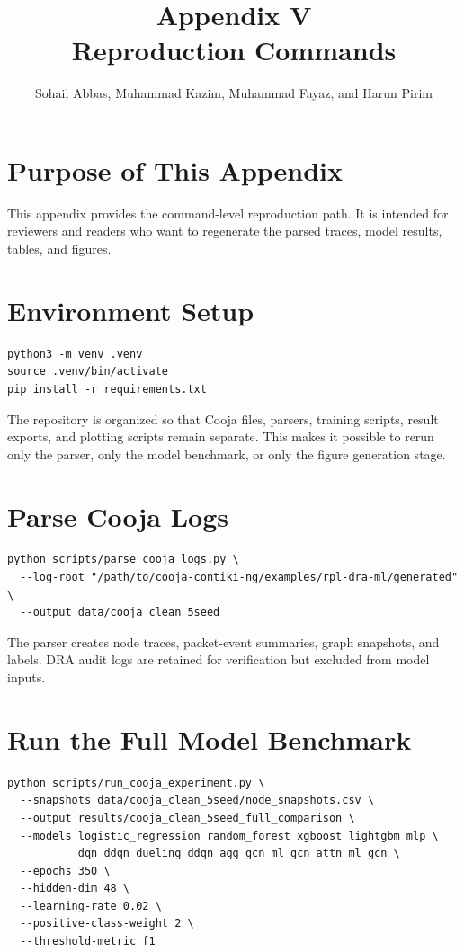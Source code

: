 \documentclass[10pt]{article}
\title{\vspace{-1.2cm}Appendix V\\Reproduction Commands}
\author{Sohail Abbas, Muhammad Kazim, Muhammad Fayaz, and Harun Pirim}
\date{}
\begin{document}
\maketitle

\section{Purpose of This Appendix}
This appendix provides the command-level reproduction path. It is intended for reviewers and readers who want to regenerate the parsed traces, model results, tables, and figures.

\section{Environment Setup}
\begin{lstlisting}
python3 -m venv .venv
source .venv/bin/activate
pip install -r requirements.txt
\end{lstlisting}

The repository is organized so that Cooja files, parsers, training scripts, result exports, and plotting scripts remain separate. This makes it possible to rerun only the parser, only the model benchmark, or only the figure generation stage.

\section{Parse Cooja Logs}
\begin{lstlisting}
python scripts/parse_cooja_logs.py \
  --log-root "/path/to/cooja-contiki-ng/examples/rpl-dra-ml/generated" \
  --output data/cooja_clean_5seed
\end{lstlisting}

The parser creates node traces, packet-event summaries, graph snapshots, and labels. DRA audit logs are retained for verification but excluded from model inputs.

\section{Run the Full Model Benchmark}
\begin{lstlisting}
python scripts/run_cooja_experiment.py \
  --snapshots data/cooja_clean_5seed/node_snapshots.csv \
  --output results/cooja_clean_5seed_full_comparison \
  --models logistic_regression random_forest xgboost lightgbm mlp \
           dqn ddqn dueling_ddqn agg_gcn ml_gcn attn_ml_gcn \
  --epochs 350 \
  --hidden-dim 48 \
  --learning-rate 0.02 \
  --positive-class-weight 2 \
  --threshold-metric f1
\end{lstlisting}
\end{document}
